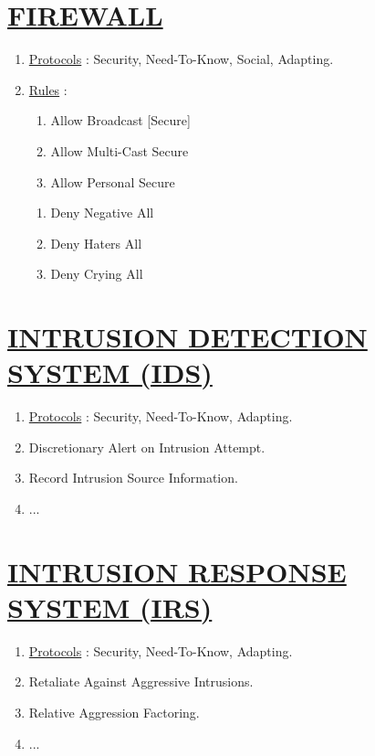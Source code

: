 \documentclass[11pt]{article}
\begin{document}
\section*{\ul{FIREWALL}}
\begin{enumerate}
	\item[] \ul{Protocols} : Security, Need-To-Know, Social, Adapting.

	\item[] \ul{Rules} :
	\begin{enumerate}
		\item[] Allow Broadcast [Secure]
		\item[] Allow Multi-Cast Secure
		\item[] Allow Personal Secure
	\end{enumerate}

	\begin{enumerate}
		\item[] Deny Negative All
		\item[] Deny Haters All
		\item[] Deny Crying All
	\end{enumerate}
	
\end{enumerate}


\section*{\ul{INTRUSION DETECTION SYSTEM (IDS)}}
\begin{enumerate}
	\item[] \ul{Protocols} : Security, Need-To-Know, Adapting.
	
	\item[] Discretionary Alert on Intrusion Attempt.
	\item[] Record Intrusion Source Information.
	\item[] ...
\end{enumerate}


\section*{\ul{INTRUSION RESPONSE SYSTEM (IRS)}}
\begin{enumerate}
	\item[] \ul{Protocols} : Security, Need-To-Know, Adapting.
	
	\item[] Retaliate Against Aggressive Intrusions.
	\item[] Relative Aggression Factoring.
	\item[] ...
\end{enumerate}
\end{document}

